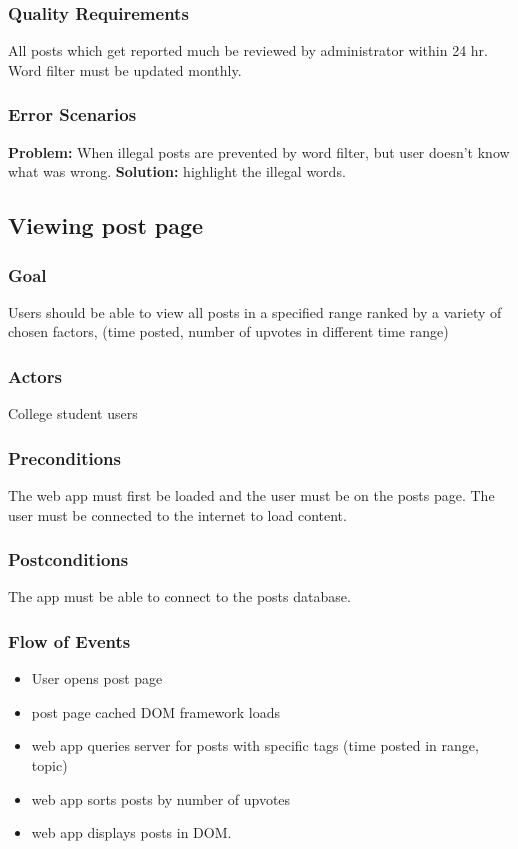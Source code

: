 \documentclass[12pt]{article}
\begin{document}
  \subsubsection{Quality Requirements}
  All posts which get reported much be reviewed by administrator within 24 hr.
  Word filter must be updated monthly.


  \subsubsection{Error Scenarios}
  \textbf{Problem:}
  When illegal posts are prevented by word filter, but user doesn’t know what was wrong.
  \textbf{Solution:}
  highlight the illegal words.

\subsection{Viewing post page}

  \subsubsection{Goal}
  Users should be able to view all posts in a specified range ranked by a variety of chosen factors, (time posted, number of upvotes in different time range)
  \subsubsection{Actors}
  College student users

  \subsubsection{Preconditions}
  The web app must first be loaded and the user must be on the posts page. The user must be connected to the internet to load content.

  \subsubsection{Postconditions}
  The app must be able to connect to the posts database.

  \subsubsection{Flow of Events}
  \begin{itemize}
    \item User opens post page
    \item post page cached DOM framework loads
    \item web app queries server for posts with specific tags (time posted in range, topic)
    \item web app sorts posts by number of upvotes
    \item web app displays posts in DOM.

  \end{itemize}
\end{document}
